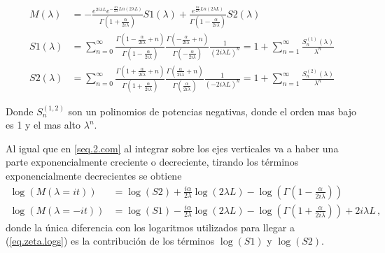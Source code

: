 \begin{align}
M( \lambda ) &= 
-
 \frac{e ^{2 i \lambda L } e ^{ - \frac{i \alpha  }{2 \lambda } Ln \left( 2 \lambda L \right) }  }
      { \Gamma \left( 1 + \frac{ \alpha}{2 i \lambda}  \right) } S1 ( \lambda ) +
 \frac{ e ^{   \frac{i \alpha  } {2 \lambda } Ln \left(2 \lambda L \right) } }
      { \Gamma \left( 1 - \frac{ \alpha}{2 i \lambda}  \right)   } S2 ( \lambda )        
      \\[10pt]      
S1 ( \lambda ) &= \sum _{n=0} ^{ \infty }
\frac{\Gamma (1 - \frac{ \alpha}{2 i \lambda} + n )}{\Gamma (1 - \frac{ \alpha}{2 i \lambda})} 
\frac{\Gamma (- \frac{ \alpha}{2 i \lambda} + n )}{\Gamma (- \frac{\alpha}{2 i \lambda})} 
\frac{1}{( 2 i \lambda L ) ^n} = 
1 + \sum _{n=1} ^{\infty} \frac{S ^{(1)} _n (\lambda)}{\lambda ^n} 
	\nonumber
	\\[10pt]
S2 (\lambda ) &= \sum _{n=0 } ^{\infty}
\frac{ \Gamma ( 1 + \frac{ \alpha}{2 i \lambda } + n ) }{\Gamma ( 1 + \frac{ \alpha}{2 i \lambda } )}
\frac{\Gamma ( \frac{ \alpha }{2 i \lambda} + n )}{\Gamma ( \frac{ \alpha }{2 i \lambda} )}
\frac{1}{( - 2 i \lambda L ) ^n} = 
1 + \sum _{n=1} ^{\infty} \frac{S ^{(2)} _n (\lambda)}{\lambda ^n}
\nonumber
\label{larga}
\end{align}

Donde $S _n ^{(1,2)}$ son un polinomios de potencias negativas, donde el orden mas bajo es 1 y el mas alto $\lambda ^n$. 


Al igual que en \ref{seq.2.com} al integrar sobre los ejes verticales va a haber una parte exponencialmente creciente o decreciente, tirando los términos exponencialmente decrecientes se obtiene
\begin{align}
\log ( M ( \lambda = i t ) ) &=   \log (S2) + 
\frac{i \alpha }{2 \lambda}  \log (2 \lambda L) - 
 \log \left( \Gamma \left( 1 - \frac{ \alpha}{2 i \lambda} \right) \right) \\ 
\log ( M ( \lambda=-i t ) ) &=  \log (S1) -  
\frac{i \alpha }{2 \lambda}  \log ( 2 \lambda L ) - 
 \log \left( \Gamma \left( 1 + \frac{ \alpha}{2 i \lambda} \right) \right) +
2 i \lambda L  \nonumber
	\,	,
\end{align}
donde la única diferencia con los logaritmos utilizados para llegar a (\ref{eq.zeta.logs}) es la contribución de los términos $\log ( S1 )$ y $ \log ( S2) $.

